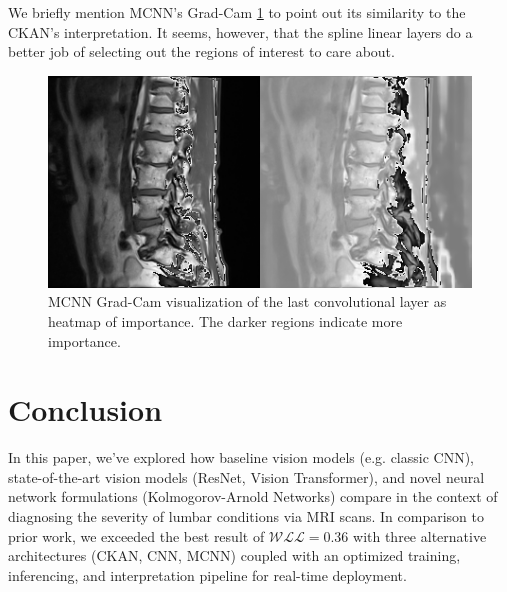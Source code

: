 \documentclass[conference]{IEEEtran}
\begin{document}
We briefly mention MCNN's Grad-Cam \ref{fig:interpret_mcnn} to point out its similarity to the CKAN's interpretation. It seems, however, that the spline linear layers do a better job of selecting out the regions of interest to care about.

\begin{figure}
    \centering
    \includegraphics[width=1.0\linewidth]{visuals/MCNN_interpretation.png}
    \caption{MCNN Grad-Cam visualization of the last convolutional layer as heatmap of importance. The darker regions indicate more importance.
    }
    \label{fig:interpret_mcnn}
\end{figure}




\section{Conclusion}
In this paper, we've explored how baseline vision models (e.g. classic CNN), state-of-the-art vision models (ResNet, Vision Transformer), and novel neural network formulations (Kolmogorov-Arnold Networks) compare in the context of diagnosing the severity of lumbar conditions via MRI scans. In comparison to prior work, we exceeded the best result of $\mathcal{WLL} = 0.36$ with three alternative architectures (CKAN, CNN, MCNN) coupled with an optimized training, inferencing, and interpretation pipeline for real-time deployment.
\end{document}
